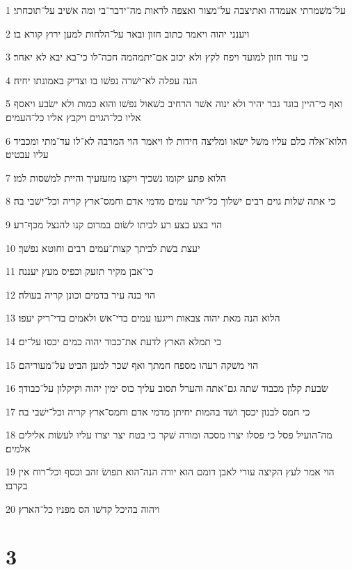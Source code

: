 \par 1 על־משׁמרתי אעמדה ואתיצבה על־מצור ואצפה לראות מה־ידבר־בי ומה אשׁיב על־תוכחתי׃
\par 2 ויענני יהוה ויאמר כתוב חזון ובאר על־הלחות למען ירוץ קורא בו׃
\par 3 כי עוד חזון למועד ויפח לקץ ולא יכזב אם־יתמהמה חכה־לו כי־בא יבא לא יאחר׃
\par 4 הנה עפלה לא־ישׁרה נפשׁו בו וצדיק באמונתו יחיה׃
\par 5 ואף כי־היין בוגד גבר יהיר ולא ינוה אשׁר הרחיב כשׁאול נפשׁו והוא כמות ולא ישׂבע ויאסף אליו כל־הגוים ויקבץ אליו כל־העמים׃
\par 6 הלוא־אלה כלם עליו משׁל ישׂאו ומליצה חידות לו ויאמר הוי המרבה לא־לו עד־מתי ומכביד עליו עבטיט׃
\par 7 הלוא פתע יקומו נשׁכיך ויקצו מזעזעיך והיית למשׁסות למו׃
\par 8 כי אתה שׁלות גוים רבים ישׁלוך כל־יתר עמים מדמי אדם וחמס־ארץ קריה וכל־ישׁבי בה׃
\par 9 הוי בצע בצע רע לביתו לשׂום במרום קנו להנצל מכף־רע׃
\par 10 יעצת בשׁת לביתך קצות־עמים רבים וחוטא נפשׁך׃
\par 11 כי־אבן מקיר תזעק וכפיס מעץ יעננה׃
\par 12 הוי בנה עיר בדמים וכונן קריה בעולה׃
\par 13 הלוא הנה מאת יהוה צבאות וייגעו עמים בדי־אשׁ ולאמים בדי־ריק יעפו׃
\par 14 כי תמלא הארץ לדעת את־כבוד יהוה כמים יכסו על־ים׃
\par 15 הוי משׁקה רעהו מספח חמתך ואף שׁכר למען הביט על־מעוריהם׃
\par 16 שׂבעת קלון מכבוד שׁתה גם־אתה והערל תסוב עליך כוס ימין יהוה וקיקלון על־כבודך׃
\par 17 כי חמס לבנון יכסך ושׁד בהמות יחיתן מדמי אדם וחמס־ארץ קריה וכל־ישׁבי בה׃
\par 18 מה־הועיל פסל כי פסלו יצרו מסכה ומורה שׁקר כי בטח יצר יצרו עליו לעשׂות אלילים אלמים׃
\par 19 הוי אמר לעץ הקיצה עורי לאבן דומם הוא יורה הנה־הוא תפושׂ זהב וכסף וכל־רוח אין בקרבו׃
\par 20 ויהוה בהיכל קדשׁו הס מפניו כל־הארץ׃

\chapter{3}

